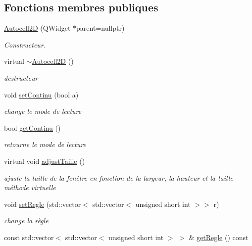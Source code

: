 \subsection*{Fonctions membres publiques}
\begin{DoxyCompactItemize}
\item 
\hyperlink{class_autocell2_d_a2e7a6a59840288dc34fef654e45f7122}{Autocell2D} (Q\+Widget $\ast$parent=nullptr)
\begin{DoxyCompactList}\small\item\em Constructeur. \end{DoxyCompactList}\item 
virtual \hyperlink{class_autocell2_d_a0e48b49cea05335ce1fb24d078d5b2c4}{$\sim$\+Autocell2D} ()
\begin{DoxyCompactList}\small\item\em destructeur \end{DoxyCompactList}\item 
void \hyperlink{class_autocell2_d_a66bf641f01edbcb5c09fb1d3c97d45c5}{set\+Continu} (bool a)
\begin{DoxyCompactList}\small\item\em change le mode de lecture \end{DoxyCompactList}\item 
bool \hyperlink{class_autocell2_d_a96ed8e1716be3afb516e849d974d9eaf}{get\+Continu} ()
\begin{DoxyCompactList}\small\item\em retourne le mode de lecture \end{DoxyCompactList}\item 
virtual void \hyperlink{class_autocell2_d_a76ab804bc939ebe1957dd2ba3ea93803}{adjust\+Taille} ()
\begin{DoxyCompactList}\small\item\em ajuste la taille de la fenêtre en fonction de la largeur, la hauteur et la taille méthode virtuelle \end{DoxyCompactList}\item 
void \hyperlink{class_autocell2_d_abe5b8001ab6709eac849b03edac0c291}{set\+Regle} (std\+::vector$<$ std\+::vector$<$ unsigned short int $>$$>$ r)
\begin{DoxyCompactList}\small\item\em change la règle \end{DoxyCompactList}\item 
const std\+::vector$<$ std\+::vector$<$ unsigned short int $>$ $>$ \& \hyperlink{class_autocell2_d_a28140bde1d71db705c86ce1ace4cbea2}{get\+Regle} () const 
$$
\end{DoxyCompactItemize}
